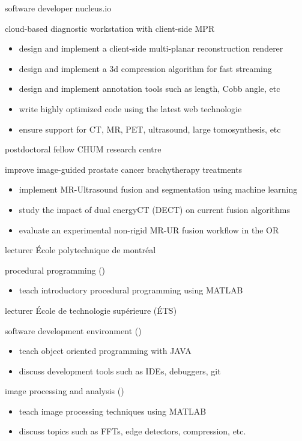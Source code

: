 \documentclass[print]{friggeri-cv}
\begin{document}
\begin{entrylist}
  {software developer} {nucleus.io}
  {cloud-based diagnostic workstation with client-side {\small MPR}
  \begin{itemize}
    \item design and implement a client-side multi-planar reconstruction renderer
    \item design and implement a 3d compression algorithm for fast streaming
    \item design and implement annotation tools such as length, Cobb angle, etc 
    \item write highly optimized code using the latest web technologie
    \item ensure support for {\small CT}, {\small MR}, {\small PET}, ultrasound, large tomosynthesis, etc 
  \end{itemize}}

  {postdoctoral fellow}
  {CHUM research centre}
  {improve image-guided prostate cancer brachytherapy treatments
  \begin{itemize}
    \item implement MR-Ultrasound fusion and segmentation using machine learning
    \item study the impact of dual energy{\small  CT} ({\small DECT}) on current fusion algorithms
    \item evaluate an experimental non-rigid {\small MR-UR} fusion workflow in the {\small OR}
  \end{itemize}}


  {lecturer}
  {École polytechnique de montréal} 
  {procedural programming (\infmat)
  \begin{itemize}
    \item teach introductory procedural programming using {\small MATLAB}
  \end{itemize}}

  {lecturer}
  {École de technologie supérieure {\scriptsize (ÉTS)}}
  {software development environment (\eleenv)
  \begin{itemize}
    \item teach object oriented programming with {\small JAVA}
    \item discuss development tools such as {\small IDE}s, debuggers, git  
  \end{itemize}
  image processing and analysis (\eletr)
    \begin{itemize}
    \item teach image processing techniques using {\small MATLAB}
    \item discuss topics such as {\small FFT}s, edge detectors, compression, etc.  
  \end{itemize}
  }
\end{entrylist}
\end{document}
